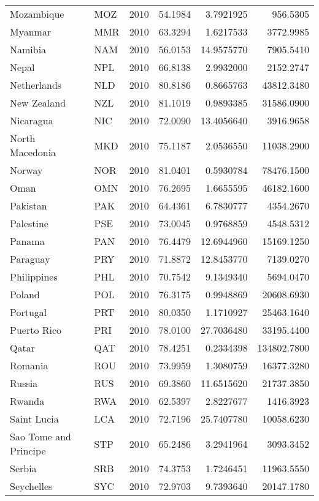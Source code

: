 \begin{longtable}[t]{llrrrr}
Mozambique & MOZ & 2010 & 54.1984 & 3.7921925 & 956.5305\\
Myanmar & MMR & 2010 & 63.3294 & 1.6217533 & 3772.9985\\
Namibia & NAM & 2010 & 56.0153 & 14.9575770 & 7905.5410\\
Nepal & NPL & 2010 & 66.8138 & 2.9932000 & 2152.2747\\
\addlinespace
Netherlands & NLD & 2010 & 80.8186 & 0.8665763 & 43812.3480\\
New Zealand & NZL & 2010 & 81.1019 & 0.9893385 & 31586.0900\\
Nicaragua & NIC & 2010 & 72.0090 & 13.4056640 & 3916.9658\\
North Macedonia & MKD & 2010 & 75.1187 & 2.0536550 & 11038.2900\\
Norway & NOR & 2010 & 81.0401 & 0.5930784 & 78476.1500\\
\addlinespace
Oman & OMN & 2010 & 76.2695 & 1.6655595 & 46182.1600\\
Pakistan & PAK & 2010 & 64.4361 & 6.7830777 & 4354.2670\\
Palestine & PSE & 2010 & 73.0045 & 0.9768859 & 4548.5312\\
Panama & PAN & 2010 & 76.4479 & 12.6944960 & 15169.1250\\
Paraguay & PRY & 2010 & 71.8872 & 12.8453770 & 7139.0270\\
\addlinespace
Philippines & PHL & 2010 & 70.7542 & 9.1349340 & 5694.0470\\
Poland & POL & 2010 & 76.3175 & 0.9948869 & 20608.6930\\
Portugal & PRT & 2010 & 80.0350 & 1.1710927 & 25463.1640\\
Puerto Rico & PRI & 2010 & 78.0100 & 27.7036480 & 33195.4400\\
Qatar & QAT & 2010 & 78.4251 & 0.2334398 & 134802.7800\\
\addlinespace
Romania & ROU & 2010 & 73.9959 & 1.3080759 & 16377.3280\\
Russia & RUS & 2010 & 69.3860 & 11.6515620 & 21737.3850\\
Rwanda & RWA & 2010 & 62.5397 & 2.8227677 & 1416.3923\\
Saint Lucia & LCA & 2010 & 72.7196 & 25.7407780 & 10058.6230\\
Sao Tome and Principe & STP & 2010 & 65.2486 & 3.2941964 & 3093.3452\\
\addlinespace
Serbia & SRB & 2010 & 74.3753 & 1.7246451 & 11963.5550\\
Seychelles & SYC & 2010 & 72.9703 & 9.7393640 & 20147.1780\\

\end{longtable}
